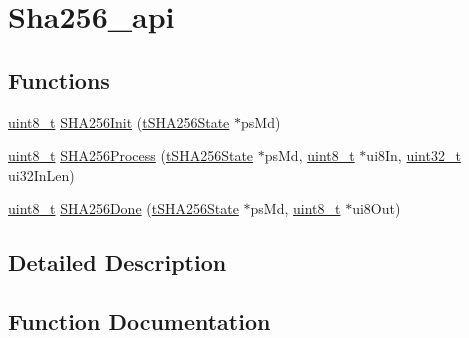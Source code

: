 \hypertarget{group__sha256__api}{}\section{Sha256\+\_\+api}
\label{group__sha256__api}
\subsection*{Functions}
\begin{DoxyCompactItemize}
\item 
\hyperlink{_p_e___types_8h_aba7bc1797add20fe3efdf37ced1182c5}{uint8\+\_\+t} \hyperlink{group__sha256__api_gaad9327a238461b7b6f526c0fa7b1ee29}{S\+H\+A256\+Init} (\hyperlink{structt_s_h_a256_state}{t\+S\+H\+A256\+State} $\ast$ps\+Md)
\item 
\hyperlink{_p_e___types_8h_aba7bc1797add20fe3efdf37ced1182c5}{uint8\+\_\+t} \hyperlink{group__sha256__api_gac4fb1378376463e788e6193c60776eaf}{S\+H\+A256\+Process} (\hyperlink{structt_s_h_a256_state}{t\+S\+H\+A256\+State} $\ast$ps\+Md, \hyperlink{_p_e___types_8h_aba7bc1797add20fe3efdf37ced1182c5}{uint8\+\_\+t} $\ast$ui8\+In, \hyperlink{_p_e___types_8h_a33594304e786b158f3fb30289278f5af}{uint32\+\_\+t} ui32\+In\+Len)
\item 
\hyperlink{_p_e___types_8h_aba7bc1797add20fe3efdf37ced1182c5}{uint8\+\_\+t} \hyperlink{group__sha256__api_ga9079ae928e86ec12db772516a5e55b4f}{S\+H\+A256\+Done} (\hyperlink{structt_s_h_a256_state}{t\+S\+H\+A256\+State} $\ast$ps\+Md, \hyperlink{_p_e___types_8h_aba7bc1797add20fe3efdf37ced1182c5}{uint8\+\_\+t} $\ast$ui8\+Out)
\end{DoxyCompactItemize}


\subsection{Detailed Description}


\subsection{Function Documentation}
